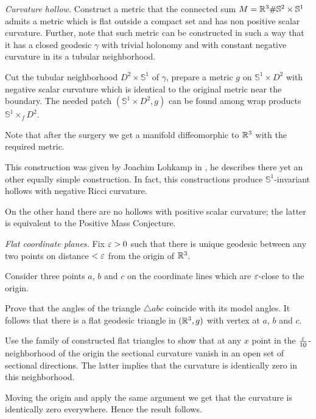 \textit{Curvature hollow.}
Construct a metric that the connected sum
$M=\mathbb{R}^3\#\mathbb{S}^2\times\mathbb{S}^1$ admits a metric which is flat outside a compact set and has non positive scalar curvature.
Further, note that such metric can be constructed in such a way that it has a closed geodesic $\gamma$ with trivial holonomy and with constant negative curvature in its a tubular neighborhood.

Cut the tubular neighborhood $D^2\times \mathbb{S}^1$ of $\gamma$, 
prepare a metric $g$ on $\mathbb{S}^1\times D^2$ with negative scalar curvature which 
is identical to the original metric near the boundary.
The needed patch $(\mathbb{S}^1\times D^2,g)$ can be found among wrap products $\mathbb{S}^1\times_f D^2$.

Note that after the surgery we get a manifold diffeomorphic to $\mathbb{R}^3$ with the required metric.

This construction was given by Joachim Lohkamp in \cite{lohkamp},
he describes there yet an other equally simple construction.
In fact,
this  constructions produce 
$\mathbb{S}^1$-invariant hollows 
with negative Ricci curvature.

On the other hand there are no hollows with positive scalar curvature;
the latter is equivalent to the Positive Mass Conjecture.

\textit{Flat coordinate planes.}
Fix $\varepsilon>0$ such that there is unique geodesic between any two points on distance $<\varepsilon$ from the origin of $\mathbb{R}^3$.

Consider three points $a$, $b$ and $c$ 
on the coordinate lines which are $\varepsilon$-close 
to the origin.

Prove that the angles of the triangle $\triangle abc$
coincide with its model angles.
It follows that there is a flat geodesic triangle in $(\mathbb{R}^3,g)$ with vertex at $a$, $b$ and $c$.

Use the family of constructed flat triangles 
to show that at any $x$ point in the $\tfrac{\varepsilon}{10}$-neighborhood of the origin
the sectional curvature 
vanish in an open set of sectional directions.
The latter implies that the curvature is identically zero 
in this neighborhood.

Moving the origin and apply the same argument we get that the curvature is identically zero everywhere.
Hence the result follows. 

